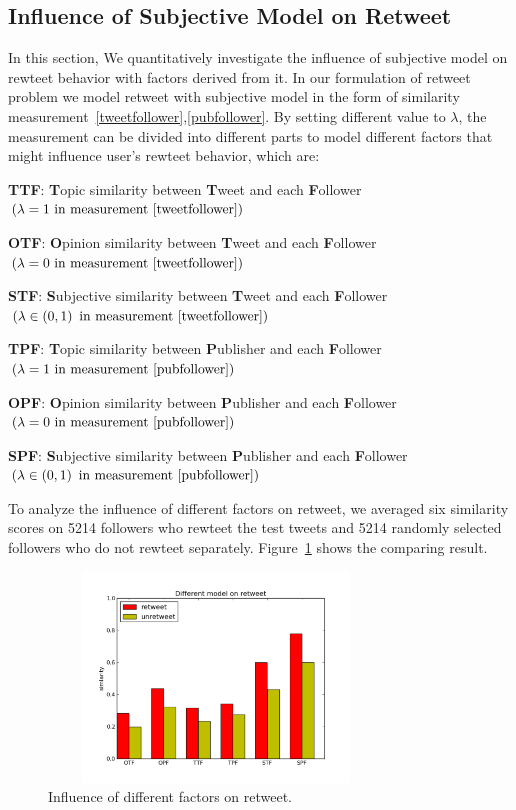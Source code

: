 \documentclass{acm_proc_article-sp}
\begin{document}
\subsection{Influence of Subjective  Model on Retweet}
\label{influence}
In this section, We quantitatively investigate the influence of subjective model on rewteet behavior with factors derived from it. 
In our formulation of retweet problem we model retweet with subjective model in the form of similarity measurement~\ref{tweetfollower},\ref{pubfollower}.
By setting different value to $ \lambda $, the measurement can be divided into different parts to model different factors that might influence user's rewteet behavior, which are:
\begin{itemize*}
\item \textbf{TTF}: \textbf{T}opic similarity between \textbf{T}weet and each \textbf{F}ollower $ \left( \lambda =1  \text{ in measurement~\ref{tweetfollower}} \right) $ 
\item \textbf{OTF}: \textbf{O}pinion similarity between \textbf{T}weet and each \textbf{F}ollower $ \left( \lambda =0 \text{ in measurement~\ref{tweetfollower}} \right) $
\item \textbf{STF}: \textbf{S}ubjective similarity between \textbf{T}weet and each \textbf{F}ollower $ \left( \lambda \in \left( 0,1 \right)   \text{ in measurement~\ref{tweetfollower}} \right) $ 
\item \textbf{TPF}: \textbf{T}opic similarity between \textbf{P}ublisher and each \textbf{F}ollower $ \left( \lambda =1  \text{ in measurement~\ref{pubfollower}}  \right) $ 
\item \textbf{OPF}: \textbf{O}pinion similarity between \textbf{P}ublisher and each \textbf{F}ollower $ \left( \lambda =0 \text{ in measurement~\ref{pubfollower}} \right) $
\item \textbf{SPF}: \textbf{S}ubjective similarity between \textbf{P}ublisher and each \textbf{F}ollower $ \left( \lambda \in \left( 0,1 \right)   \text{ in measurement~\ref{pubfollower}} \right) $
\end{itemize*}
To analyze the influence of different factors on retweet, we averaged six similarity scores on 5214 followers who rewteet the test tweets and 5214 randomly selected followers who do not rewteet separately. 
Figure~\ref{fig:graph6} shows the comparing result.
\begin{figure}[htb]
\centering
\includegraphics[width=3.5in,height=2.2in]{component.pdf}
\caption{Influence of different factors on retweet.}
\label{fig:graph6}
\end{figure}
\end{document}
